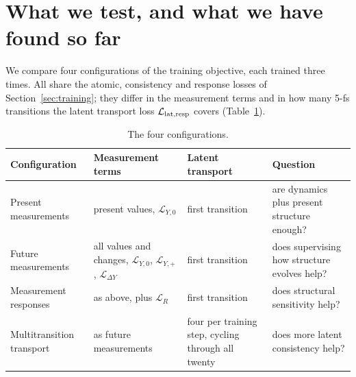 \documentclass[11pt,a4paper]{article}
\numberwithin{equation}{section}
\begin{document}
\section{What we test, and what we have found so far}
\label{sec:findings}

We compare four configurations of the training objective, each trained three
times. All share the atomic, consistency and response losses of
Section~\ref{sec:training}; they differ in the measurement terms and in how many
5-fs transitions the latent transport loss $\mathcal L_{\rm lat,resp}$ covers
(Table~\ref{tab:configs}).

\begin{table}[ht]
\centering\small
\caption{The four configurations.}
\label{tab:configs}
\renewcommand{\arraystretch}{1.12}
\begin{tabularx}{\linewidth}{@{}>{\raggedright\arraybackslash}p{3.0cm}
  >{\raggedright\arraybackslash}p{3.6cm} >{\raggedright\arraybackslash}p{2.7cm} >{\raggedright\arraybackslash}X@{}}
\toprule
Configuration & Measurement terms & Latent transport & Question\\
\midrule
Present measurements & present values, $\mathcal L_{Y,0}$ & first transition
  & are dynamics plus present structure enough?\\
Future measurements & all values and changes, $\mathcal L_{Y,0}$, $\mathcal L_{Y,+}$, $\mathcal L_{\Delta Y}$
  & first transition & does supervising how structure evolves help?\\
Measurement responses & as above, plus $\mathcal L_R$ & first transition
  & does structural sensitivity help?\\
Multitransition transport & as future measurements & four per training step, cycling through all twenty
  & does more latent consistency help?\\
\bottomrule
\end{tabularx}
\end{table}
\end{document}
